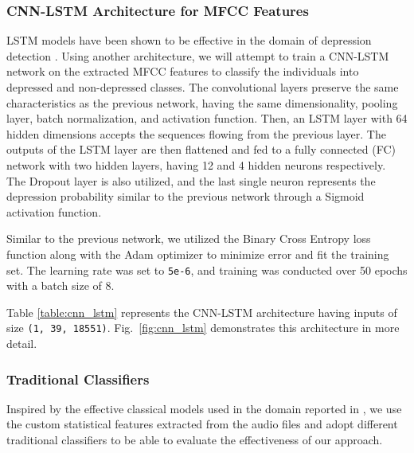 \subsubsection{CNN-LSTM Architecture for MFCC Features}

LSTM models have been shown to be effective in the domain of depression detection \cite{al2018detecting}. Using another architecture, we will attempt to train a CNN-LSTM network on the extracted MFCC features to classify the individuals into depressed and non-depressed classes. The convolutional layers preserve the same characteristics as the previous network, having the same dimensionality, pooling layer, batch normalization, and activation function. Then, an LSTM layer with 64 hidden dimensions accepts the sequences flowing from the previous layer. The outputs of the LSTM layer are then flattened and fed to a fully connected (FC) network with two hidden layers, having 12 and 4 hidden neurons respectively. The Dropout layer is also utilized, and the last single neuron represents the depression probability similar to the previous network through a Sigmoid activation function.

Similar to the previous network, we utilized the Binary Cross Entropy loss function along with the Adam optimizer to minimize error and fit the training set. The learning rate was set to \texttt{5e-6}, and training was conducted over 50 epochs with a batch size of 8.

Table \ref{table:cnn_lstm} represents the CNN-LSTM architecture having inputs of size \texttt{(1, 39, 18551)}. Fig.~\ref{fig:cnn_lstm} demonstrates this architecture in more detail.

\subsubsection{Traditional Classifiers}

Inspired by the effective classical models used in the domain reported in \cite{wu2023automatic}, we use the custom statistical features extracted from the audio files and adopt different traditional classifiers to be able to evaluate the effectiveness of our approach.

